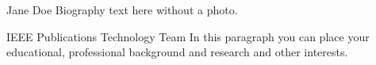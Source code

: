 \documentclass[lettersize,journal]{IEEEtran}
\begin{document}
\printbibliography

\begin{IEEEbiographynophoto}{Jane Doe}
  Biography text here without a photo.
\end{IEEEbiographynophoto}

\begin{IEEEbiography}{IEEE Publications Technology Team}
  In this paragraph you can place your educational, professional background and research and other interests.\end{IEEEbiography}
\end{document}
